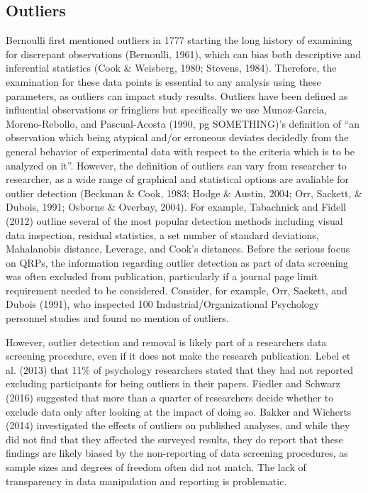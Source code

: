\documentclass[english,man]{apa6}
\theoremstyle{definition}
\theoremstyle{definition}
\theoremstyle{definition}
\theoremstyle{remark}
\begin{document}
\subsection{Outliers}\label{outliers}

Bernoulli first mentioned outliers in 1777 starting the long history of
examining for discrepant observations (Bernoulli, 1961), which can bias
both descriptive and inferential statistics (Cook \& Weisberg, 1980;
Stevens, 1984). Therefore, the examination for these data points is
essential to any analysis using these parameters, as outliers can impact
study results. Outliers have been defined as influential observations or
fringliers but specifically we use Munoz-Garcia, Moreno-Rebollo, and
Pascual-Acosta (1990, pg SOMETHING)'s definition of \enquote{an
observation which being atypical and/or erroneous deviates decidedly
from the general behavior of experimental data with respect to the
criteria which is to be analyzed on it}. However, the definition of
outliers can vary from researcher to researcher, as a wide range of
graphical and statistical options are avaliable for outlier detection
(Beckman \& Cook, 1983; Hodge \& Austin, 2004; Orr, Sackett, \& Dubois,
1991; Osborne \& Overbay, 2004). For example, Tabachnick and Fidell
(2012) outline several of the most popular detection methods including
visual data inspection, residual statistics, a set number of standard
deviations, Mahalanobis distance, Leverage, and Cook's distances. Before
the serious focus on QRPs, the information regarding outlier detection
as part of data screening was often excluded from publication,
particularly if a journal page limit requirement needed to be
considered. Consider, for example, Orr, Sackett, and Dubois (1991), who
inspected 100 Industrial/Organizational Psychology personnel studies and
found no mention of outliers.

However, outlier detection and removal is likely part of a researchers
data screening procedure, even if it does not make the research
publication. Lebel et al. (2013) that 11\% of psychology researchers
stated that they had not reported excluding participants for being
outliers in their papers. Fiedler and Schwarz (2016) suggested that more
than a quarter of researchers decide whether to exclude data only after
looking at the impact of doing so. Bakker and Wicherts (2014)
investigated the effects of outliers on published analyses, and while
they did not find that they affected the surveyed results, they do
report that these findings are likely biased by the non-reporting of
data screening procedures, as sample sizes and degrees of freedom often
did not match. The lack of transparency in data manipulation and
reporting is problematic.
\end{document}

